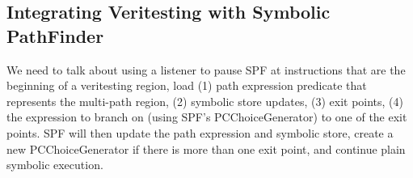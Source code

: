 \subsection{Integrating Veritesting with Symbolic PathFinder}
%
We need to talk about using a listener to pause SPF at instructions that
are the beginning of a veritesting region, load (1) path expression
predicate that represents the multi-path region, (2) symbolic store
updates, (3) exit points, (4) the expression to branch on (using
SPF's PCChoiceGenerator) to one of the exit points.
SPF will then update the path expression and symbolic store, create a
new PCChoiceGenerator if there is more than one exit point, and continue
plain symbolic execution.

